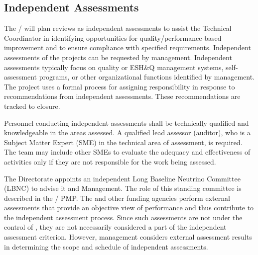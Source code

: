 \subsection{Independent Assessments}

The /  will plan reviews as
independent assessments to assist the  Technical
Coordinator in identifying opportunities for quality/performance-based
improvement and to ensure compliance with specified
requirements. Independent assessments of the  projects can
be requested by  management. Independent assessments
typically focus on quality or ESH\&Q management systems, self-
assessment programs, or other organizational functions identified by
management. The  project uses a formal process for
assigning responsibility in response to recommendations from
independent assessments. These recommendations are tracked to closure.

Personnel conducting independent assessments shall be technically
qualified and knowledgeable in the areas assessed. A qualified lead
assessor (auditor), who is a Subject Matter Expert (SME) in the
technical area of assessment, is required. The team may include other
SMEs to evaluate the adequacy and effectiveness of activities only if
they are not responsible for the work being assessed.

The \fnal Directorate appoints an independent Long Baseline Neutrino
Committee (LBNC) to advise it and  Management. The role of
this standing committee is described in the /
PMP. The  and other funding agencies perform external
assessments that provide an objective view of performance and thus
contribute to the independent assessment process. Since such
assessments are not under the control of , they are not
necessarily considered a part of the independent assessment
criterion. However,  management considers external
assessment results in determining the scope and schedule of
independent assessments.
